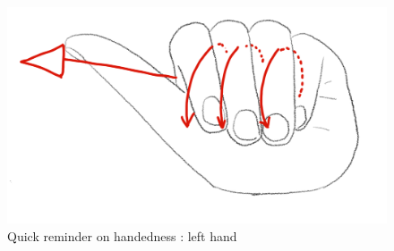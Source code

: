 \documentclass[aspectratio=169]{beamer}
\begin{document}
\begin{frame}
	\begin{figure}
		\centering
		\includegraphics[width=0.7\linewidth]{images/hand}
		\caption{Quick reminder on handedness : left hand}
	\end{figure}
\end{frame}
\end{document}
